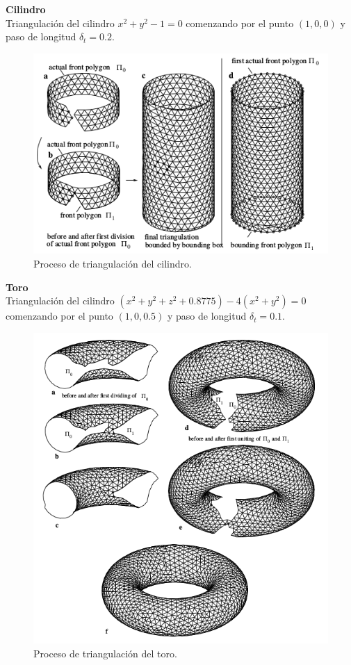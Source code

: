 \newpage
\textbf{Cilindro}
\[\]
Triangulación del cilindro $x^2 + y^2 - 1 = 0$ comenzando por el punto $(1,0,0)$ y paso de longitud $\delta_t = 0.2$. 
\[\]
\begin{figure}[h]
\centering
\includegraphics[scale=0.8]{images/hartmann7.png}
\caption{Proceso de triangulación del cilindro.}
\end{figure}

\newpage
\textbf{Toro}
\[\]
Triangulación del cilindro $(x^2+y^2+z^2+0.8775) - 4(x^2+y^2)=0$ comenzando por el punto $(1,0,0.5)$ y paso de longitud $\delta_t = 0.1$.
\[\]

\begin{figure}[h]
\centering
\includegraphics[scale=0.7]{images/hartmann8.png}
\caption{Proceso de triangulación del toro.}
\end{figure}

